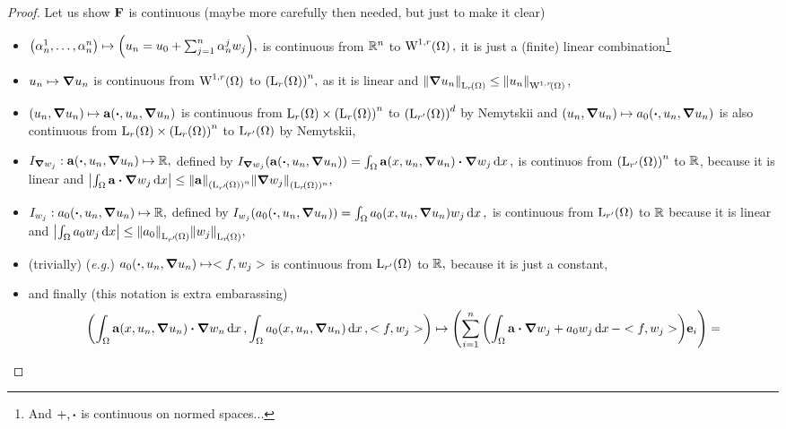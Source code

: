 \documentclass{article}
\begin{document}
\begin{proof}
	Let us show $\vb{F}$ is continuous (maybe more carefully then needed, but just to make it clear)
	\begin{itemize}
		\item $\qty(\alpha_n^1, \dots, \alpha_n^n) \mapsto \qty(u_n = u_0 + \sum_{j=1}^n \alpha^j_n w_j),$ is continuous from ${\mathbb R}^{n}$ to $\WkpSet[1][r]{\Omega},$ it is just a (finite) linear combination\footnote{And $+, \vdot$ is continuous on normed spaces...}
		\item $u_n \mapsto \grad u_n$ is continuous from $\WkpSet[1][r]{\Omega}$ to $\qty(\LpSet[r]{\Omega})^{n},$ as it is linear and $\norm{\grad u_n}_{\LpSet[r]{\Omega}}\leq  \norm{u_n}_{\WkpSet[1][r]{\Omega}}$,
		\item $\qty(u_n, \grad u_n) \mapsto \vb{a}\qty(\vdot, u_n, \grad u_n)$ is continuous from $\LpSet[r]{\Omega} \times \qty(\LpSet[r]{\Omega})^{n}$ to $\qty(\LpSet[r']{\Omega})^d$ by Nemytskii and $\qty(u_n, \grad u_n) \mapsto a_0\qty(\vdot, u_n, \grad u_n)$ is also continuous from $\LpSet[r]{\Omega} \times \qty(\LpSet[r]{\Omega})^n$ to $\LpSet[r']{\Omega}$ by Nemytskii,
		\item $I_{\grad w_j}:\vb{a}\qty(\vdot, u_n, \grad u_n) \mapsto \R,$ defined by $I_{\grad w_j}\qty(\vb{a}\qty(\vdot, u_n, \grad u_n)) = \int_{\Omega}\vb{a}\qty(x, u_n, \grad u_n) \vdot \grad w_j\dd{x},$ is continuos from $\qty(\LpSet[r']{\Omega})^{n}$ to ${\mathbb R}$, because it is linear and $\abs{\int_{\Omega}\vb{a} \vdot \grad w_j\dd{x}} \leq \norm{\vb{a}}_{\qty(\LpSet[r']{\Omega})^n} \norm{\grad w_j}_{(\LpSet[r]{\Omega})^n},$
		\item $I_{w_j}:a_0\qty(\vdot, u_n, \grad u_n) \mapsto \R,$ defined by $I_{w_j}\qty(a_0\qty(\vdot, u_n, \grad u_n)) = \int_{\Omega}a_0\qty(x, u_n, \grad u_n)w_j\dd{x},$ is continuous from $\LpSet[r']{\Omega}$ to ${\mathbb R}$ because it is linear and $\abs{\int_{\Omega}a_0 w_j\dd{x}} \leq \norm{a_0}_{\LpSet[r']{\Omega}} \norm{w_j}_{\LpSet[r]{\Omega}},$
		\item (trivially) (\textit{e.g.}) $a_0\qty(\vdot, u_n, \grad u_n) \mapsto <f, w_j>$ is continuous from $\LpSet[r']{\Omega}$ to ${\mathbb R},$ because it is just a constant,
		\item and finally (this notation is extra embarassing)
			\begin{align*}
				&\qty(\int_{\Omega}\vb{a}\qty(x, u_n, \grad u_n) \vdot \grad w_n\dd{x}, \int_{\Omega}a_0\qty(x, u_n, \grad u_n)\dd{x}, <f, w_j>) \mapsto \qty(\sum_{i=1}^n \qty(\int_{\Omega}\vb{a} \vdot \grad w_j + a_0 w_j\dd{x}-<f, w_j>)\vb{e}_i)= \\

\end{align*}
\end{itemize}
\end{proof}
\end{document}
